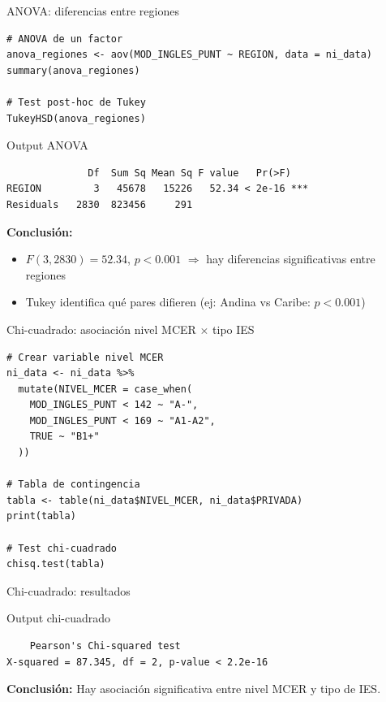 \documentclass[aspectratio=169, 11pt]{beamer}
\begin{document}
\begin{frame}[fragile]{ANOVA: diferencias entre regiones}
\begin{lstlisting}
# ANOVA de un factor
anova_regiones <- aov(MOD_INGLES_PUNT ~ REGION, data = ni_data)
summary(anova_regiones)

# Test post-hoc de Tukey
TukeyHSD(anova_regiones)
\end{lstlisting}

\vspace{0.3cm}
\begin{exampleblock}{Output ANOVA}
\small
\begin{verbatim}
              Df  Sum Sq Mean Sq F value   Pr(>F)
REGION         3   45678   15226   52.34 < 2e-16 ***
Residuals   2830  823456     291
\end{verbatim}
\end{exampleblock}

\textbf{Conclusión:}
\begin{itemize}
\item $F(3, 2830) = 52.34$, $p < 0.001$ $\Rightarrow$ hay diferencias significativas entre regiones
\item Tukey identifica qué pares difieren (ej: Andina vs Caribe: $p < 0.001$)
\end{itemize}
\end{frame}

\begin{frame}[fragile]{Chi-cuadrado: asociación nivel MCER $\times$ tipo IES}
\begin{lstlisting}
# Crear variable nivel MCER
ni_data <- ni_data %>%
  mutate(NIVEL_MCER = case_when(
    MOD_INGLES_PUNT < 142 ~ "A-",
    MOD_INGLES_PUNT < 169 ~ "A1-A2",
    TRUE ~ "B1+"
  ))

# Tabla de contingencia
tabla <- table(ni_data$NIVEL_MCER, ni_data$PRIVADA)
print(tabla)

# Test chi-cuadrado
chisq.test(tabla)
\end{lstlisting}
\end{frame}

\begin{frame}[fragile]{Chi-cuadrado: resultados}
\begin{exampleblock}{Output chi-cuadrado}
\small
\begin{verbatim}
    Pearson's Chi-squared test
X-squared = 87.345, df = 2, p-value < 2.2e-16
\end{verbatim}
\end{exampleblock}

\vspace{0.3cm}
\textbf{Conclusión:} Hay asociación significativa entre nivel MCER y tipo de IES.
\end{frame}
\end{document}
